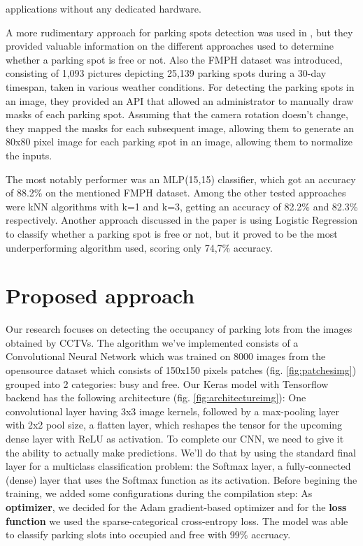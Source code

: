 \documentclass[runningheads,a4paper,11pt]{report}
\begin{document}
applications without any dedicated hardware.
\par
A more rudimentary approach for parking spots detection was used in \cite{roman},
but they provided valuable information on the different approaches used
to determine whether a parking spot is free or not. Also the FMPH dataset
was introduced, consisting of 1,093 pictures depicting 25,139 parking
spots during a 30-day timespan, taken in various weather conditions.
For detecting the parking spots in an image, they provided an API that
allowed an administrator to manually draw masks of each parking spot.
Assuming that the camera rotation doesn't change, they mapped the masks
for each subsequent image, allowing them to generate an 80x80 pixel
image for each parking spot in an image, allowing them to normalize
the inputs.
\par
The most notably performer was an MLP(15,15) classifier, which got an accuracy
of 88.2\% on the mentioned FMPH dataset. Among the other tested approaches
were kNN algorithms with k=1 and k=3, getting an accuracy of 82.2\% and
82.3\% respectively. Another approach discussed in the paper is using
Logistic Regression to classify whether a parking spot is free or not,
but it proved to be the most underperforming algorithm used, scoring
only 74,7\% accuracy.


\chapter{Proposed approach}
\label{chapter:proposedApproach}

Our research focuses on detecting the occupancy of parking lots from the images obtained by CCTVs.
The algorithm we've implemented consists of a Convolutional Neural Network which was trained on 8000 images from the opensource 
\cite{cnrpark} dataset which consists of 150x150 pixels patches (fig. \ref{fig:patchesimg}) grouped into 2 categories: busy and free.
Our Keras model with Tensorflow backend has the following architecture (fig. \ref{fig:architectureimg}): One convolutional layer having 3x3 image kernels,
followed by a max-pooling layer with 2x2 pool size, a flatten layer, which reshapes the tensor for the upcoming dense layer 
with ReLU as activation. To complete our CNN, we need to give it the ability to actually make predictions. 
We’ll do that by using the standard final layer for a multiclass classification problem: 
the Softmax layer, a fully-connected (dense) layer that uses the Softmax function as its activation.
Before begining the training, we added some configurations during the compilation step:
As \textbf{optimizer}, we decided for the Adam gradient-based optimizer and for the \textbf{loss function} 
we used the sparse-categorical cross-entropy loss. The model was able to classify parking slots into occupied and free with 99\% accruacy.
\end{document}
